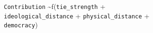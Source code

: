 \texttt{Contribution} \sim f(\texttt{tie_strength} + \\ \texttt{ideological_distance} + \texttt{physical_distance} + \\ \texttt{democracy})
